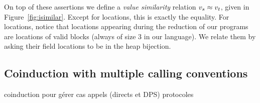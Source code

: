 On top of these assertions we define a \emph{value similarity} relation $\datalangVal_s \iSimilar \datalangVal_t$, given in Figure~\ref{fig:isimilar}.  Except for locations, this is exactly the equality. For locations, notice that locations appearing during the reduction of our programs are locations of valid blocks (always of size 3 in our language). We relate them by asking their field locations to be in the heap bijection.





\subsection{Coinduction with multiple calling conventions}

coinduction pour gérer cas appels (directs et DPS)
protocoles

